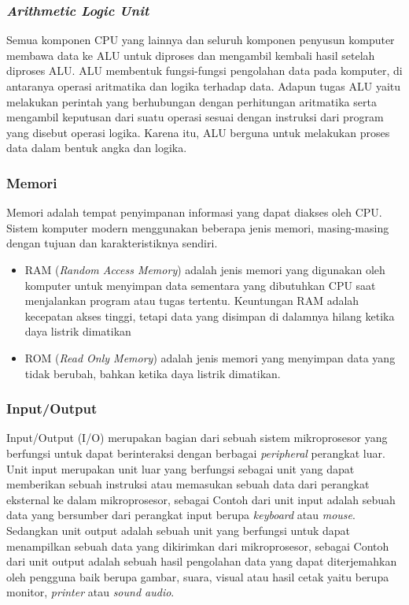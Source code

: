 \documentclass[12pt]{article}
\begin{document}
	\subsubsection*{\textit{Arithmetic Logic Unit}}
	Semua komponen CPU yang lainnya dan seluruh komponen penyusun komputer membawa data ke ALU untuk diproses dan mengambil kembali hasil setelah diproses ALU. ALU membentuk fungsi-fungsi pengolahan data pada komputer, di antaranya operasi aritmatika dan logika terhadap data. Adapun tugas ALU yaitu melakukan perintah yang berhubungan dengan perhitungan aritmatika serta mengambil keputusan dari suatu operasi sesuai dengan instruksi dari program yang disebut operasi logika. Karena itu, ALU berguna untuk melakukan proses data dalam bentuk angka dan logika.
	\subsubsection*{Memori}
	Memori adalah tempat penyimpanan informasi yang dapat diakses oleh CPU. Sistem komputer modern menggunakan beberapa jenis memori, masing-masing dengan tujuan dan karakteristiknya sendiri. 
	\begin{itemize}
		\item RAM (\textit{Random Access Memory}) adalah jenis memori yang digunakan oleh komputer untuk menyimpan data sementara yang dibutuhkan CPU saat menjalankan program atau tugas tertentu. Keuntungan RAM adalah kecepatan akses tinggi, tetapi data yang disimpan di dalamnya hilang ketika daya listrik dimatikan
		\item ROM (\textit{Read Only Memory}) adalah jenis memori yang menyimpan data yang tidak berubah, bahkan ketika daya listrik dimatikan. 
	\end{itemize}
	\subsubsection*{Input/Output}
	Input/Output (I/O) merupakan bagian dari sebuah sistem mikroprosesor yang berfungsi untuk dapat berinteraksi dengan berbagai \textit{peripheral} perangkat luar. Unit input merupakan unit luar yang berfungsi sebagai unit yang dapat memberikan sebuah instruksi atau memasukan sebuah data dari perangkat eksternal ke dalam mikroprosesor, sebagai Contoh dari unit input adalah sebuah data yang bersumber dari perangkat input berupa \textit{keyboard} atau \textit{mouse}. Sedangkan unit output adalah sebuah unit yang berfungsi untuk dapat menampilkan sebuah data yang dikirimkan dari  mikroprosesor, sebagai Contoh dari unit output adalah sebuah hasil pengolahan data yang dapat diterjemahkan oleh pengguna baik berupa gambar, suara, visual atau hasil cetak yaitu berupa monitor, \textit{printer} atau \textit{sound audio}.
	
\end{document}

